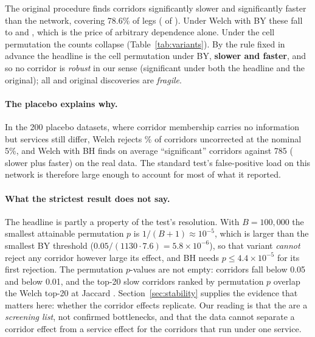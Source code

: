 The original procedure finds \fzBottlenecks{} corridors significantly slower and \fzFasterCorridors{} significantly faster than the network, covering 78.6\% of legs (\fzLegsCovered{} of \fzLegsTotal{}). Under Welch with BY these fall to \fzAuditByWelchSlower{} and \fzAuditByWelchFaster{}, which is the price of arbitrary dependence alone. Under the cell permutation the counts collapse (Table~\ref{tab:variants}). By the rule fixed in advance the headline is the cell permutation under BY, \textbf{\fzAuditRobustHeadlineSlower{} slower and \fzAuditRobustHeadlineFaster{} faster}, and so no corridor is \emph{robust} in our sense (significant under both the headline and the original); all \fzBottlenecks{} and \fzFasterCorridors{} original discoveries are \emph{fragile}.

\paragraph{The placebo explains why.} In the 200 placebo datasets, where corridor membership carries no information but services still differ, Welch rejects \fzAuditPlaceboRejectionPct{}\% of corridors uncorrected at the nominal 5\%, and Welch with BH finds on average \fzAuditPlaceboDiscoveriesDpOne{} ``significant'' corridors against 785 (\fzBottlenecks{} slower plus \fzFasterCorridors{} faster) on the real data. The standard test's false-positive load on this network is therefore large enough to account for most of what it reported.

\paragraph{What the strictest result does not say.} The headline is partly a property of the test's resolution. With $B=100{,}000$ the smallest attainable permutation $p$ is $1/(B+1)\approx 10^{-5}$, which is larger than the smallest BY threshold ($0.05/(1130\cdot 7.6)=5.8\times10^{-6}$), so that variant \emph{cannot} reject any corridor however large its effect, and BH needs $p\le 4.4\times 10^{-5}$ for its first rejection. The permutation $p$-values are not empty: \fzAuditPermPBelowFivePct{} corridors fall below 0.05 and \fzAuditPermPBelowOnePct{} below 0.01, and the top-20 slow corridors ranked by permutation $p$ overlap the Welch top-20 at Jaccard \fzAuditTopTwentyJaccardListDpTwo{}. Section~\ref{sec:stability} supplies the evidence that matters here: whether the corridor effects replicate. Our reading is that the \fzBottlenecks{} are a \emph{screening list}, not confirmed bottlenecks, and that the data cannot separate a corridor effect from a service effect for the corridors that run under one service.

